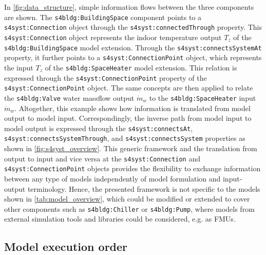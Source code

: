 In \autoref{fig:data_structure}, simple information flows between the three components are shown. The \texttt{s4bldg:BuildingSpace} component points to a \texttt{s4syst:Connection} object through the \texttt{s4syst:connectedThrough} property. This \texttt{s4syst:Connection} object represents the indoor temperature output $T_z$ of the \texttt{s4bldg:BuildingSpace} model extension. Through the \texttt{s4syst:connectsSystemAt} property, it further points to a \texttt{s4syst:ConnectionPoint} object, which represents the input $T_z$ of the \texttt{s4bldg:SpaceHeater} model extension. This relation is expressed through the \texttt{s4syst:ConnectionPoint} property of the \texttt{s4syst:ConnectionPoint} object. The same concepts are then applied to relate the \texttt{s4bldg:Valve} water massflow output $\dot{m}_w$ to the \texttt{s4bldg:SpaceHeater} input $\dot{m}_w$. Altogether, this example shows how information is translated from model output to model input. Correspondingly, the inverse path from model input to model output is expressed through the \texttt{s4syst:connectsAt}, \texttt{s4syst:connectsSystemThrough}, and  \texttt{s4syst:connectsSystem} properties as shown in \autoref{fig:s4syst_overview}. This generic framework and the translation from output to input and vice versa at the \texttt{s4syst:Connection} and \texttt{s4syst:ConnectionPoint} objects provides the flexibility to exchange information between any type of models independently of model formulation and input-output terminology. Hence, the presented framework is not specific to the models shown in \autoref{tab:model_overview}, which could be modified or extended to cover other components such as \texttt{s4bldg:Chiller} or \texttt{s4bldg:Pump}, where models from external simulation tools and libraries could be considered, e.g. as FMUs.  



\subsection{Model execution order}
\label{sec:simulation_framework}

